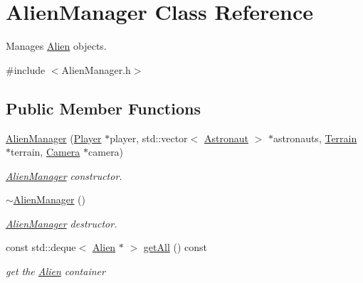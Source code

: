 \hypertarget{class_alien_manager}{}\section{Alien\+Manager Class Reference}
\label{class_alien_manager}


Manages \hyperlink{class_alien}{Alien} objects.  




{\ttfamily \#include $<$Alien\+Manager.\+h$>$}

\subsection*{Public Member Functions}
\begin{DoxyCompactItemize}
\item 
\hyperlink{class_alien_manager_a742da1e39310d7693fa2fcbc60d7bf15}{Alien\+Manager} (\hyperlink{class_player}{Player} $\ast$player, std\+::vector$<$ \hyperlink{class_astronaut}{Astronaut} $>$ $\ast$astronauts, \hyperlink{class_terrain}{Terrain} $\ast$terrain, \hyperlink{class_camera}{Camera} $\ast$camera)
\begin{DoxyCompactList}\small\item\em \hyperlink{class_alien_manager}{Alien\+Manager} constructor. \end{DoxyCompactList}\item 
\mbox{\label{class_alien_manager_a593f0f436f0954d4fc1e432486b746f6}} 
\hyperlink{class_alien_manager_a593f0f436f0954d4fc1e432486b746f6}{$\sim$\+Alien\+Manager} ()
\begin{DoxyCompactList}\small\item\em \hyperlink{class_alien_manager}{Alien\+Manager} destructor. \end{DoxyCompactList}\item 
\mbox{\label{class_alien_manager_a0f6713bb3452f5949da43b870ac7b746}} 
const std\+::deque$<$ \hyperlink{class_alien}{Alien} $\ast$ $>$ \hyperlink{class_alien_manager_a0f6713bb3452f5949da43b870ac7b746}{get\+All} () const
\begin{DoxyCompactList}\small\item\em get the \hyperlink{class_alien}{Alien} container \end{DoxyCompactList}\item 
\mbox{\label{class_alien_manager_a4af75ee3ee02f8e327d065d1079e37b6}} 

\end{DoxyCompactItemize}
